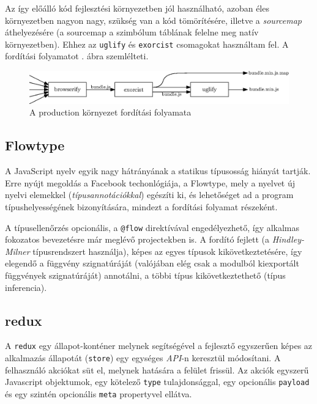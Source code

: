 \documentclass[12pt]{article}
\begin{document}
Az így előálló kód fejlesztési környezetben jól használható, azoban éles környezetben
nagyon nagy, szükség van a kód tömörítésére, illetve a \emph{sourcemap} áthelyezésére
(a sourcemap a szimbólum táblának felelne meg natív környezetben).
Ehhez az \texttt{uglify} és \texttt{exorcist} csomagokat használtam fel.
A fordítási folyamatot . ábra szemlélteti.

\begin{figure}[h!]
  \centering
  \includegraphics[width=\textwidth]{figures/uglify}
  \caption{A production környezet fordítási folyamata}
  \label{fig:uglify}
\end{figure}

\subsection{Flowtype}

A JavaScript nyelv egyik nagy hátrányának a statikus típusosság hiányát tartják.
Erre nyújt megoldás a Facebook techonlógiája, a Flowtype\cite{flowtype}, mely a nyelvet
új nyelvi elemekkel (\emph{típusannotációkkal}) egészíti ki, és lehetőséget ad a program
típushelyességének bizonyítására, mindezt a fordítási folyamat részeként.

A típusellenőrzés opcionális, a \texttt{@flow} direktívával engedélyezhető, így alkalmas
fokozatos bevezetésre már meglévő projectekben is.
A fordító fejlett (a \emph{Hindley-Milner}\cite{hindley-milner} típusrendszert használja), képes az egyes típusok kikövetkeztetésére, így elegendő
a függvény szignatúráját (valójában elég csak a modulból kiexportált függvények
szignatúráját) annotálni, a többi típus kikövetkeztethető (típus inferencia).

\subsection{redux}

A \texttt{redux}\cite{redux} egy állapot-konténer melynek segítségével a fejlesztő egyszerűen képes
az alkalmazás állapotát (\texttt{store}) egy egységes \emph{API}-n keresztül módosítani.
A felhasználó akciókat süt el, melynek hatására a felület frissül.
Az akciók egyszerű Javascript objektumok, egy kötelező \texttt{type} tulajdonsággal,
egy opcionális \texttt{payload} és egy szintén opcionális \texttt{meta} propertyvel ellátva.
\end{document}
